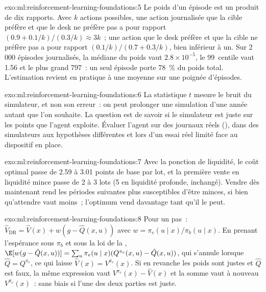 \begin{solution}{exo:ml:reinforcement-learning-foundations:5}
Le poids d'un épisode est un produit de dix rapports. Avec $k$ actions possibles, une action journalisée que la cible préfère et
que le desk ne préfère pas a pour rapport $(0.9 + 0.1/k)/(0.3/k)\approx3k$~; une action que le desk préfère et que la cible ne préfère pas a pour rapport
$(0.1/k)/(0.7 + 0.3/k)$, bien inférieur à un. Sur 2\,000 épisodes journalisés, la
médiane du poids vaut $2.8\times10^{-5}$, le 99~centile vaut 1.56 et le plus grand 797~: un seul épisode porte 78~\% du
poids total. L'estimation revient en pratique à une moyenne sur une poignée d'épisodes.
\end{solution}

\begin{solution}{exo:ml:reinforcement-learning-foundations:6}
La statistique $t$ mesure le bruit du simulateur, et non son erreur~: on peut prolonger une simulation d'une année autant
que l'on souhaite. La question est de savoir si le simulateur est juste sur les points que l'agent exploite. Évaluer l'agent sur des journaux réels
(), dans des simulateurs aux hypothèses différentes et lors d'un essai réel limité face au dispositif en place.
\end{solution}

\begin{solution}{exo:ml:reinforcement-learning-foundations:7}
Avec la ponction de liquidité, le coût optimal passe de 2.59 à 3.01 points de base par lot, et la première vente en liquidité mince passe
de 2 à 3 lots (5 en liquidité profonde, inchangé). Vendre dès maintenant rend les périodes suivantes plus susceptibles d'être minces, si bien qu'attendre vaut
moins~; l'optimum vend davantage tant qu'il le peut.
\end{solution}

\begin{solution}{exo:ml:reinforcement-learning-foundations:8}
Pour un pas~: $\hat V_{\mathrm{DR}} = \hat V(x) + w(g - \hat Q(x, u))$ avec $w = \pi_e(u\mid x)/\pi_b(u\mid x)$. En prenant
l'espérance sous $\pi_b$ et sous la loi de la , $\E[w(g - \hat Q(x, u))] = \sum_u\pi_e(u\mid x)(Q^{\pi_e}(x, u) -
\hat Q(x, u))$, qui s'annule lorsque $\hat Q = Q^{\pi_e}$, ce qui laisse $\hat V(x) = V^{\pi_e}(x)$. Si en revanche les poids sont
justes et $\hat Q$ est faux, la même expression vaut $V^{\pi_e}(x) - \hat V(x)$ et la somme vaut à nouveau $V^{\pi_e}(x)$~:
sans biais si l'une des deux parties est juste.
\end{solution}

